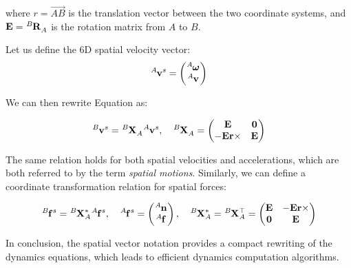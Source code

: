 where $r=\overset{\longrightarrow}{AB}$ is the translation vector
between the two coordinate systems, and $\mathbf{E} =
\tensor*[^B]{\mathbf{R}}{_A}$ is the rotation matrix from $A$ to $B$.

Let us define the 6D spatial velocity vector:
\begin{equation}
  \tensor*[^A]{\mathbf{v}}{^s}=
  \left(\begin{matrix}
    \tensor*[^A]{\boldsymbol{\omega}}{}\\
    \tensor*[^A]{\mathbf{v}}{}
  \end{matrix}\right)
\end{equation}

We can then rewrite Equation  as:

\begin{equation}
  \tensor*[^B]{\mathbf{v}}{^s}=
  \tensor*[^B]{\mathbf{X}}{_A}
  \tensor*[^A]{\mathbf{v}}{^s}
  ,\quad
  \tensor*[^B]{\mathbf{X}}{_A}=
    \left(\begin{matrix}
    \mathbf{E} & \mathbf{0} \\
    -\mathbf{E}\mathbf{r}\times & \mathbf{E}
  \end{matrix}\right)
\end{equation}

The same relation holds for both spatial velocities and accelerations,
which are both referred to by the term \emph{spatial motions}.
Similarly, we can define a coordinate transformation relation for
spatial forces:

\begin{equation}
  \tensor*[^B]{\mathbf{f}}{^s}=
  \tensor*[^B]{\mathbf{X}}{^*_A}
  \tensor*[^A]{\mathbf{f}}{^s}
  ,\quad
  \tensor*[^A]{\mathbf{f}}{^s}=
  \left(\begin{matrix}
    \tensor*[^A]{\mathbf{n}}{}\\
    \tensor*[^A]{\mathbf{f}}{}
  \end{matrix}\right)
  ,\quad
  \tensor*[^B]{\mathbf{X}}{^*_A}=\tensor*[^B]{\mathbf{X}}{^\top_A}=
    \left(\begin{matrix}
    \mathbf{E} & -\mathbf{E}\mathbf{r}\times \\
    \mathbf{0} & \mathbf{E}
  \end{matrix}\right)
\end{equation}

In conclusion, the spatial vector notation provides a compact
rewriting of the dynamics equations, which leads to efficient dynamics
computation algorithms.

